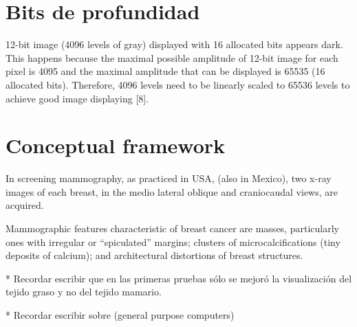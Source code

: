 \section{Bits de profundidad}

12-bit image (4096 levels of gray) displayed with 16 allocated bits appears
dark. This happens because the maximal possible amplitude of 12-bit image for
each pixel is 4095 and the maximal amplitude that can be displayed is 65535 (16
allocated bits). Therefore, 4096 levels need to be linearly scaled to 65536
levels to achieve good image displaying [8].

\section{Conceptual framework}

In screening mammography, as practiced in
USA, (also in Mexico), two x-ray images of each breast, in the medio lateral
oblique and craniocaudal views, are acquired. 

Mammographic features characteristic of breast cancer are masses, particularly
ones with irregular or “spiculated” margins; clusters of microcalcifications
(tiny deposits of calcium); and architectural distortions of breast structures. 

* Recordar escribir que en las primeras pruebas sólo se mejoró  la
visualización del tejido graso y no del tejido mamario.

* Recordar escribir sobre (general purpose computers)

